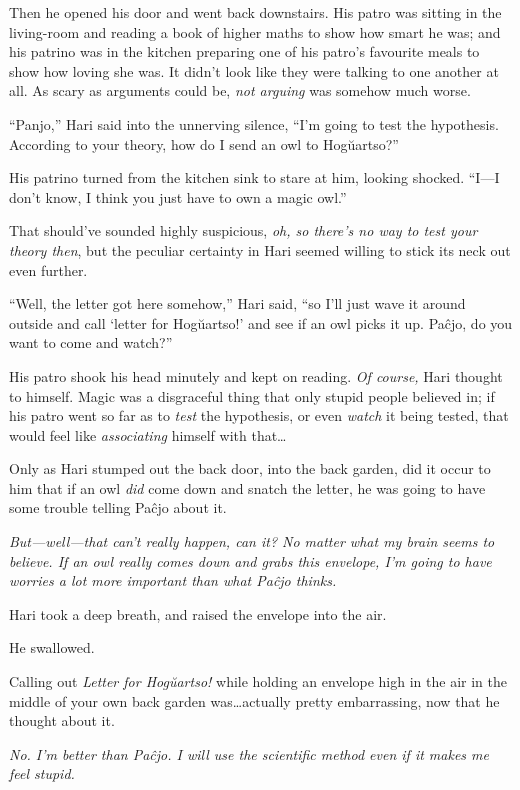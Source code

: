 Then he opened his door and went back downstairs. His patro was sitting in the living-room and reading a book of higher maths to show how smart he was; and his patrino was in the kitchen preparing one of his patro’s favourite meals to show how loving she was. It didn’t look like they were talking to one another at all. As scary as arguments could be, \emph{not arguing} was somehow much worse.

“Panjo,” Hari said into the unnerving silence, “I’m going to test the hypothesis. According to your theory, how do I send an owl to Hogŭartso?”

His patrino turned from the kitchen sink to stare at him, looking shocked. “I—I don’t know, I think you just have to own a magic owl.”

That should’ve sounded highly suspicious, \emph{oh, so there’s no way to test your theory then}, but the peculiar certainty in Hari seemed willing to stick its neck out even further.

“Well, the letter got here somehow,” Hari said, “so I’ll just wave it around outside and call ‘letter for Hogŭartso!’ and see if an owl picks it up. Paĉjo, do you want to come and watch?”

His patro shook his head minutely and kept on reading. \emph{Of course,} Hari thought to himself. Magic was a disgraceful thing that only stupid people believed in; if his patro went so far as to \emph{test} the hypothesis, or even \emph{watch} it being tested, that would feel like \emph{associating} himself with that…

Only as Hari stumped out the back door, into the back garden, did it occur to him that if an owl \emph{did} come down and snatch the letter, he was going to have some trouble telling Paĉjo about it.

\emph{But—well—that can’t \emph{really} happen, can it? No matter what my brain seems to believe. If an owl really comes down and grabs this envelope, I’m going to have worries a lot more important than what Paĉjo thinks.}

Hari took a deep breath, and raised the envelope into the air.

He swallowed.

Calling out \emph{Letter for Hogŭartso!} while holding an envelope high in the air in the middle of your own back garden was…actually pretty embarrassing, now that he thought about it.

\emph{No. I’m better than Paĉjo. I will use the scientific method even if it makes me feel stupid.}

